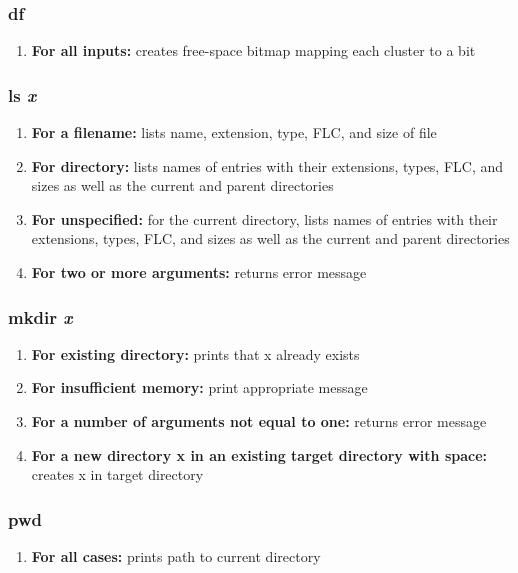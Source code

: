 \documentclass[a4paper]{article}
\begin{document}
\subsubsection{df}
\begin{enumerate}
\item {\textbf{For all inputs: } creates free-space bitmap mapping each cluster to a bit}
\end{enumerate}

\subsubsection{ls \textit{x}}
\begin{enumerate}
\item {\textbf{For a filename: } lists name, extension, type, FLC, and size of file}
\item {\textbf{For directory: } lists names of entries with their extensions,  types, FLC, and sizes as well as the current and parent directories}
\item {\textbf{For unspecified: } for the current directory, lists names of entries with their extensions,  types, FLC, and sizes as well as the current and parent directories}
\item {\textbf{For two or more arguments: } returns error message}
\end{enumerate}

\subsubsection{mkdir \textit{x}}
\begin{enumerate}
\item {\textbf{For existing directory: } prints that x already exists}
\item {\textbf{For insufficient memory: } print appropriate message}
\item {\textbf{For a number of arguments not equal to one: } returns error message}
\item {\textbf{For a new directory x in an existing target directory with space: } creates x in target directory}
\end{enumerate}

\subsubsection{pwd}
\begin{enumerate}
\item {\textbf{For all cases: } prints path to current directory}
\end{enumerate}
\end{document}
